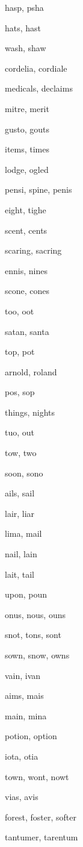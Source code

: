     \item hasp, psha
    \item hats, hast
    \item wash, shaw
    \item cordelia, cordiale
    \item medicals, declaims
    \item mitre, merit
    \item gusto, gouts
    \item items, times
    \item lodge, ogled
    \item pensi, spine, penis
    \item eight, tighe
    \item scent, cents
    \item scaring, sacring
    \item ennis, nines
    \item scone, cones
    \item too, oot
    \item satan, santa
    \item top, pot
    \item arnold, roland
    \item pos, sop
    \item things, nights
    \item tuo, out
    \item tow, two
    \item soon, sono
    \item ails, sail
    \item lair, liar
    \item lima, mail
    \item nail, lain
    \item lait, tail
    \item upon, poun
    \item onus, nous, ouns
    \item snot, tons, sont
    \item sown, snow, owns
    \item vain, ivan
    \item aims, mais
    \item main, mina
    \item potion, option
    \item iota, otia
    \item town, wont, nowt
    \item vias, avis
    \item forest, foster, softer
    \item tantumer, tarentum
